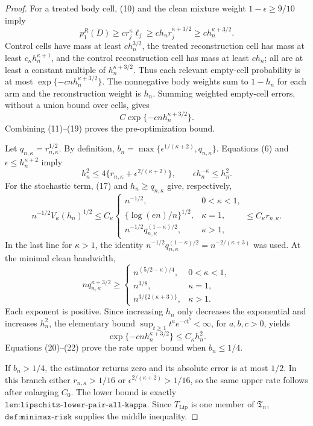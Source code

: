 \documentclass{article}
\begin{document}
\begin{proof}
For a treated body cell, (10) and the clean mixture weight \(1-\epsilon\geq9/10\) imply
\[
p_1^R(D)\geq c r_j^\kappa\ell_j
\geq c h_nr_j^{\kappa+1/2}
\geq c h_n^{\kappa+3/2}.
\tag{18}
\]
Control cells have mass at least \(c h_n^{3/2}\), the treated reconstruction cell has mass at least \(c_\kappa h_n^{\kappa+1}\), and the control reconstruction cell has mass at least \(ch_n\); all are at least a constant multiple of \(h_n^{\kappa+3/2}\). Thus each relevant empty-cell probability is at most \(\exp\{-cnh_n^{\kappa+3/2}\}\). The nonnegative body weights sum to \(1-h_n\) for each arm and the reconstruction weight is \(h_n\). Summing weighted empty-cell errors, without a union bound over cells, gives
\[
C\exp\{-cnh_n^{\kappa+3/2}\}.
\tag{19}
\]
Combining (11)--(19) proves the pre-optimization bound.

Let \(q_{n,\kappa}=r_{n,\kappa}^{1/2}\). By definition, \(b_n=\max\{\epsilon^{1/(\kappa+2)},q_{n,\kappa}\}\). Equations (6) and \(\epsilon\leq h_n^{\kappa+2}\) imply
\[
h_n^2\leq4\{r_{n,\kappa}+\epsilon^{2/(\kappa+2)}\},
\qquad
\epsilon h_n^{-\kappa}\leq h_n^2.
\tag{20}
\]
For the stochastic term, (17) and \(h_n\geq q_{n,\kappa}\) give, respectively,
\[
n^{-1/2}V_\kappa(h_n)^{1/2}
\leq C_\kappa
\begin{cases}
n^{-1/2},&0<\kappa<1,\\
\{\log(en)/n\}^{1/2},&\kappa=1,\\
n^{-1/2}q_{n,\kappa}^{(1-\kappa)/2},&\kappa>1,
\end{cases}
\leq C_\kappa r_{n,\kappa}.
\tag{21}
\]
In the last line for \(\kappa>1\), the identity
\(n^{-1/2}q_{n,\kappa}^{(1-\kappa)/2}=n^{-2/(\kappa+3)}\) was used. At the minimal clean bandwidth,
\[
nq_{n,\kappa}^{\kappa+3/2}\geq
\begin{cases}
n^{(5/2-\kappa)/4},&0<\kappa<1,\\
n^{3/8},&\kappa=1,\\
n^{3/\{2(\kappa+3)\}},&\kappa>1.
\end{cases}
\]
Each exponent is positive. Since increasing \(h_n\) only decreases the exponential and increases \(h_n^2\), the elementary bound \(\sup_{t\geq1}t^a e^{-ct^b}<\infty\), for \(a,b,c>0\), yields
\[
\exp\{-cnh_n^{\kappa+3/2}\}\leq C_\kappa h_n^2.
\tag{22}
\]
Equations (20)--(22) prove the rate upper bound when \(b_n\leq1/4\).

If \(b_n>1/4\), the estimator returns zero and its absolute error is at most \(1/2\). In this branch either \(r_{n,\kappa}>1/16\) or \(\epsilon^{2/(\kappa+2)}>1/16\), so the same upper rate follows after enlarging \(C_0\). The lower bound is exactly \(\texttt{lem:lipschitz-lower-pair-all-kappa}\). Since \(T_{\mathrm{Lip}}\) is one member of \(\mathfrak T_n\), \(\texttt{def:minimax-risk}\) supplies the middle inequality.


\end{proof}
\end{document}
